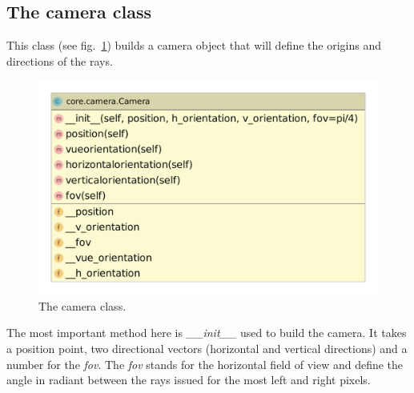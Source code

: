 \documentclass[a4paper,11pt]{article}%
\begin{document}
\subsection*{The camera class}
This class (see fig.~\ref{fig:camera}) builds a camera object that will define the origins and directions of the rays.
\begin{figure}[h]
    \centering
    \includegraphics[scale=0.3]{img/camera.pdf}
    \caption{The camera class.}
    \label{fig:camera}
\end{figure}
The most important method here is \emph{\_\_init\_\_} used to build the camera. It takes a position point, two directional vectors (horizontal and vertical directions) and a number for the \textit{fov}.
The \textit{fov} stands for the horizontal field of view and define the angle in radiant between the rays issued for the most left and right pixels.
\end{document}
